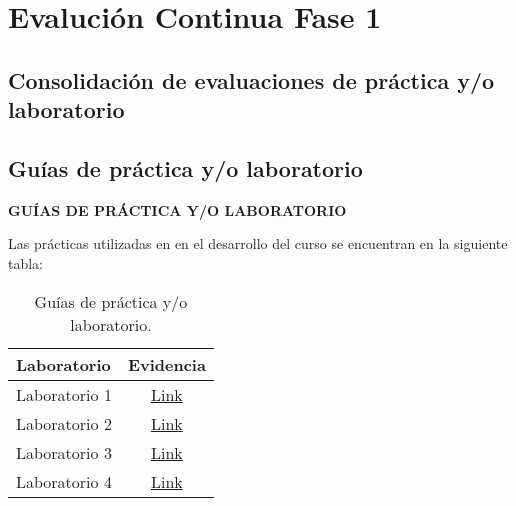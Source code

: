 \chapter{Evalución Continua Fase 1}
\newpage

\pagestyle{fancy} 

\clearpage
{}
\vspace*{\fill}
{\centering
	\section{Consolidación de evaluaciones de práctica y/o laboratorio}}
\vspace*{\fill}


\clearpage
{}
\vspace*{\fill}
{\centering
	\section{Guías de práctica y/o laboratorio}}
\vspace*{\fill}

\clearpage

\vspace{1cm}

{\centering \textbf{GUÍAS DE PRÁCTICA Y/O LABORATORIO}}

\begin{flushleft}
	Las prácticas utilizadas en en el desarrollo del curso se encuentran en la siguiente tabla:
\end{flushleft}

\begin{table}[H]
	\centering
	\caption{Guías de práctica y/o laboratorio.}
	\begin{tabular}{|l|c|}
		\hline
		\textbf{Laboratorio} & 
		\textbf{Evidencia} 
		\\ \hline
		Laboratorio 1 &
		\href{https://drive.google.com/drive/folders/0B4QL7QHQ91XKfjJHZ0VpTmYxaDRfclZQal9IZ1JNUG9EcFdCcWdfN0NiRkJjaXJiNlhiS0E?usp=sharing}{Link}
		\\ \hline
		Laboratorio 2 &
		\href{https://drive.google.com/drive/folders/0B4QL7QHQ91XKfjJHZ0VpTmYxaDRfclZQal9IZ1JNUG9EcFdCcWdfN0NiRkJjaXJiNlhiS0E?usp=sharing}{Link}
		\\ \hline
		Laboratorio 3 &
		\href{https://drive.google.com/drive/folders/0B4QL7QHQ91XKfjJHZ0VpTmYxaDRfclZQal9IZ1JNUG9EcFdCcWdfN0NiRkJjaXJiNlhiS0E?usp=sharing}{Link}
		\\ \hline
		Laboratorio 4 &
		\href{https://drive.google.com/drive/folders/0B4QL7QHQ91XKfjJHZ0VpTmYxaDRfclZQal9IZ1JNUG9EcFdCcWdfN0NiRkJjaXJiNlhiS0E?usp=sharing}{Link}
		\\ \hline
	\end{tabular}
\end{table}

